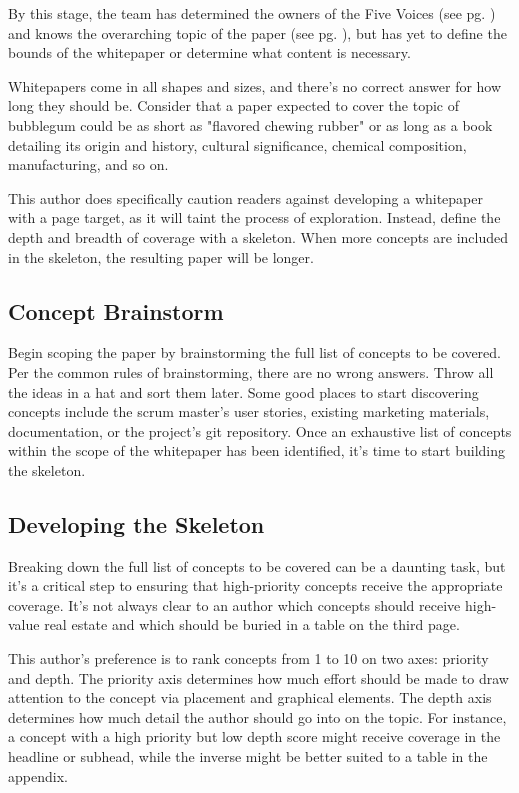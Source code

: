 \documentclass[letterpaper]{article}
\begin{document}
By this stage, the team has determined the owners of the Five Voices (see pg. \pageref{topic:voices}) and knows the overarching topic of the paper (see pg. \pageref{appendix:topic}), but has yet to define the bounds of the whitepaper or determine what content is necessary. 

Whitepapers come in all shapes and sizes, and there's no correct answer for how long they should be. Consider that a paper expected to cover the topic of bubblegum could be as short as "flavored chewing rubber" or as long as a book detailing its origin and history, cultural significance, chemical composition, manufacturing, and so on. 

This author does specifically caution readers against developing a whitepaper with a page target, as it will taint the process of exploration. Instead, define the depth and breadth of coverage with a skeleton. When more concepts are included in the skeleton, the resulting paper will be longer.

\subsection{Concept Brainstorm}
Begin scoping the paper by brainstorming the full list of concepts to be covered. Per the common rules of brainstorming, there are no wrong answers. Throw all the ideas in a hat and sort them later. Some good places to start discovering concepts include the scrum master's user stories, existing marketing materials, documentation, or the project's git repository. Once an exhaustive list of concepts within the scope of the whitepaper has been identified, it's time to start building the skeleton.

\subsection{Developing the Skeleton}\label{topic:skeleton}
Breaking down the full list of concepts to be covered can be a daunting task, but it's a critical step to ensuring that high-priority concepts receive the appropriate coverage. It's not always clear to an author which concepts should receive high-value real estate and which should be buried in a table on the third page.

This author's preference is to rank concepts from 1 to 10 on two axes: priority and depth. The priority axis determines how much effort should be made to draw attention to the concept via placement and graphical elements. The depth axis determines how much detail the author should go into on the topic. For instance, a concept with a high priority but low depth score might receive coverage in the headline or subhead, while the inverse might be better suited to a table in the appendix.
\end{document}
